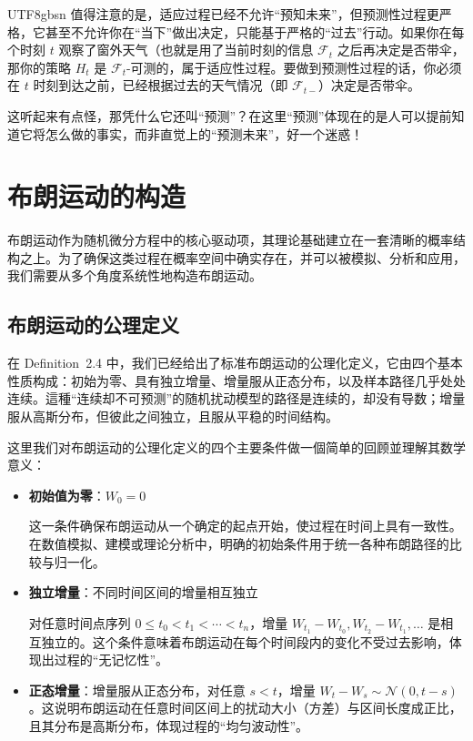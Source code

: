 \documentclass{article}
\begin{document}
\begin{CJK*}{UTF8}{gbsn}
值得注意的是，适应过程已经不允许“预知未来”，但预测性过程更严格，它甚至不允许你在“当下”做出决定，只能基于严格的“过去”行动。如果你在每个时刻 $t$ 观察了窗外天气（也就是用了当前时刻的信息 $\mathcal{F}_{t}$ 之后再决定是否带伞，那你的策略 $H_t$ 是 $\mathcal{F}_t$-可测的，属于适应性过程。要做到预测性过程的话，你必须在 $t$ 时刻到达之前，已经根据过去的天气情况（即 $\mathcal{F}_{t-}$）决定是否带伞。

这听起来有点怪，那凭什么它还叫“预测”？在这里“预测”体现在的是人可以提前知道它将怎么做的事实，而非直觉上的“预测未来”，好一个迷惑！

\section{布朗运动的构造}

布朗运动作为随机微分方程中的核心驱动项，其理论基础建立在一套清晰的概率结构之上。为了确保这类过程在概率空间中确实存在，并可以被模拟、分析和应用，我们需要从多个角度系统性地构造布朗运动。

\subsection{布朗运动的公理定义}

在 Definition~2.4 中，我们已经给出了标准布朗运动的公理化定义，它由四个基本性质构成：初始为零、具有独立增量、增量服从正态分布，以及样本路径几乎处处连续。這種“连续却不可预测”的随机扰动模型的路径是连续的，却没有导数；增量服从高斯分布，但彼此之间独立，且服从平稳的时间结构。

这里我们对布朗运动的公理化定义的四个主要条件做一個简单的回顾並理解其数学意义：

\begin{itemize}

    \item \textbf{初始值为零}：$W_0 = 0$

    这一条件确保布朗运动从一个确定的起点开始，使过程在时间上具有一致性。在数值模拟、建模或理论分析中，明确的初始条件用于统一各种布朗路径的比较与归一化。

    \item \textbf{独立增量}：不同时间区间的增量相互独立

    对任意时间点序列 $0 \leq t_0 < t_1 < \cdots < t_n$，增量 $W_{t_1} - W_{t_0}, W_{t_2} - W_{t_1}, \dots$ 是相互独立的。这个条件意味着布朗运动在每个时间段内的变化不受过去影响，体现出过程的“无记忆性”。

    \item \textbf{正态增量}：增量服从正态分布，对任意 $s < t$，增量 $W_t - W_s \sim \mathcal{N}(0, t - s)$。这说明布朗运动在任意时间区间上的扰动大小（方差）与区间长度成正比，且其分布是高斯分布，体现过程的“均匀波动性”。


\end{itemize}
\end{CJK*}
\end{document}
